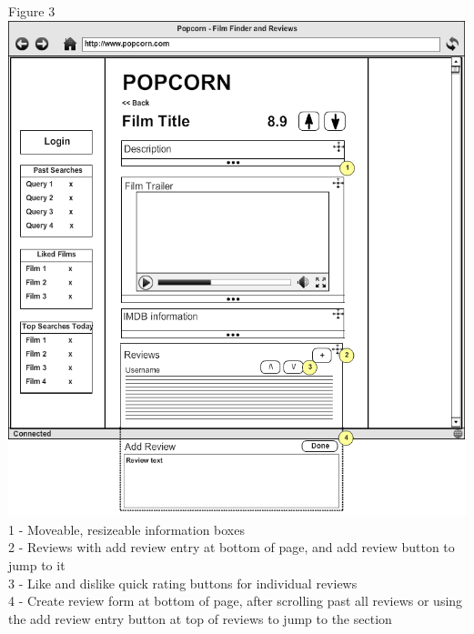 \documentclass{sig-alt-release2}
\begin{document}
Figure 3\\
\includegraphics[scale=0.3]{wireframe3.png}
1 - Moveable, resizeable information boxes \\
2 - Reviews with add review entry at bottom of page, and add review button to jump to it \\
3 - Like and dislike quick rating buttons for individual reviews \\
4 - Create review form at bottom of page, after scrolling past all reviews or using the add review entry button at top of reviews to jump to the section\\
\end{document}
